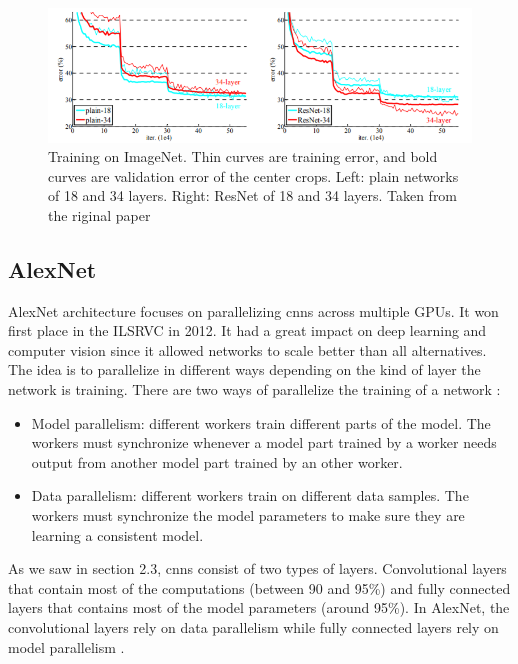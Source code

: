 \begin{figure}[!htp]
    \centering
        \includegraphics[width=1\textwidth]{figures/02-Resnet_comparing_acc}
        \caption[Degradation problem solved]{Training on ImageNet. Thin curves are training error, and bold curves are validation error of the center crops. Left: plain
networks of 18 and 34 layers. Right: ResNet of 18 and 34 layers. Taken from the riginal paper \cite{resnetpaper}}\label{fig:resnetaccs}
\end{figure}

\subsection{AlexNet}
AlexNet architecture focuses on parallelizing \gls{cnn}s across multiple GPUs. It won first place in the ILSRVC in 2012. It had a great impact on deep learning and computer vision since it allowed networks to scale better than all alternatives.
The idea is to parallelize in different ways depending on the kind of layer the network is training\cite{alexpaper}. There are two ways of parallelize the training of a network : 
\begin{itemize}
    \item Model parallelism: different workers train different parts of the model. The workers must synchronize whenever a model part trained by a worker needs output from another model part trained by an other worker.  
    \item Data parallelism: different workers train on different data samples. The workers must synchronize the model parameters to make sure they are learning a consistent model. 
\end{itemize}
As we saw in section 2.3, \gls{cnn}s consist of two types of layers. Convolutional layers that contain most of the computations (between 90 and 95\%) and fully connected layers that contains most of the model parameters (around 95\%). In AlexNet, the convolutional layers rely on data parallelism while fully connected layers rely on model parallelism \cite{alexpaper}. 

